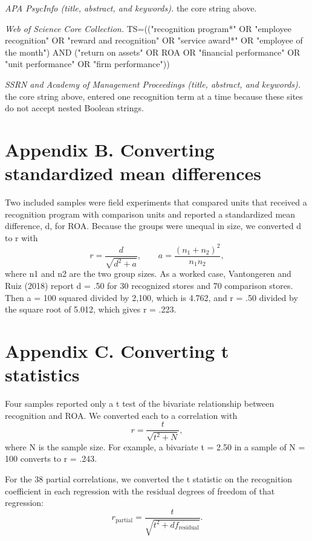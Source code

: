 \documentclass[11pt]{article}
\begin{document}
\noindent\textit{APA PsycInfo (title, abstract, and keywords).} the core string above.

\noindent\textit{Web of Science Core Collection.} TS=(("recognition program*" OR "employee recognition" OR "reward and recognition" OR "service award*" OR "employee of the month") AND ("return on assets" OR ROA OR "financial performance" OR "unit performance" OR "firm performance"))

\noindent\textit{SSRN and Academy of Management Proceedings (title, abstract, and keywords).} the core string above, entered one recognition term at a time because these sites do not accept nested Boolean strings.

\section*{Appendix B. Converting standardized mean differences}

Two included samples were field experiments that compared units that received a recognition program with comparison units and reported a standardized mean difference, d, for ROA. Because the groups were unequal in size, we converted d to r with
\[
r = \frac{d}{\sqrt{d^2 + a}}, \qquad a = \frac{(n_1 + n_2)^2}{n_1 n_2},
\]
where n1 and n2 are the two group sizes. As a worked case, Vantongeren and Ruiz (2018) report d = .50 for 30 recognized stores and 70 comparison stores. Then a = 100 squared divided by 2,100, which is 4.762, and r = .50 divided by the square root of 5.012, which gives r = .223.

\section*{Appendix C. Converting t statistics}

Four samples reported only a t test of the bivariate relationship between recognition and ROA. We converted each to a correlation with
\[
r = \frac{t}{\sqrt{t^2 + N}},
\]
where N is the sample size. For example, a bivariate t = 2.50 in a sample of N = 100 converts to r = .243.

For the 38 partial correlations, we converted the t statistic on the recognition coefficient in each regression with the residual degrees of freedom of that regression:
\[
r_{\text{partial}} = \frac{t}{\sqrt{t^2 + df_{\text{residual}}}}.
\]
\end{document}
